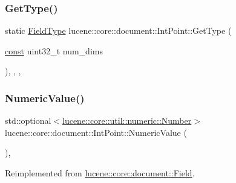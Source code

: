 \subsubsection{\texorpdfstring{Get\+Type()}{GetType()}}
{\footnotesize\ttfamily static \mbox{\hyperlink{classlucene_1_1core_1_1document_1_1FieldType}{Field\+Type}} lucene\+::core\+::document\+::\+Int\+Point\+::\+Get\+Type (\begin{DoxyParamCaption}\item[{\mbox{\hyperlink{ZlibCrc32_8h_a2c212835823e3c54a8ab6d95c652660e}{const}} uint32\+\_\+t}]{num\+\_\+dims }\end{DoxyParamCaption})\hspace{0.3cm}{\ttfamily [inline]}, {\ttfamily [static]}, {\ttfamily [private]}, {\ttfamily [noexcept]}}

\mbox{\label{classlucene_1_1core_1_1document_1_1IntPoint_a738e9e2cc41c77f835aac8f06da801ac}} 
\subsubsection{\texorpdfstring{Numeric\+Value()}{NumericValue()}}
{\footnotesize\ttfamily std\+::optional$<$\mbox{\hyperlink{classlucene_1_1core_1_1util_1_1numeric_1_1Number}{lucene\+::core\+::util\+::numeric\+::\+Number}}$>$ lucene\+::core\+::document\+::\+Int\+Point\+::\+Numeric\+Value (\begin{DoxyParamCaption}{ }\end{DoxyParamCaption})\hspace{0.3cm}{\ttfamily [inline]}, {\ttfamily [virtual]}}



Reimplemented from \mbox{\hyperlink{classlucene_1_1core_1_1document_1_1Field_a858814043215c98bacf6ecc823d078ea}{lucene\+::core\+::document\+::\+Field}}.

\mbox{\label{classlucene_1_1core_1_1document_1_1IntPoint_ab72dd15b82e4c9807910db3b2ac3a737}} 

